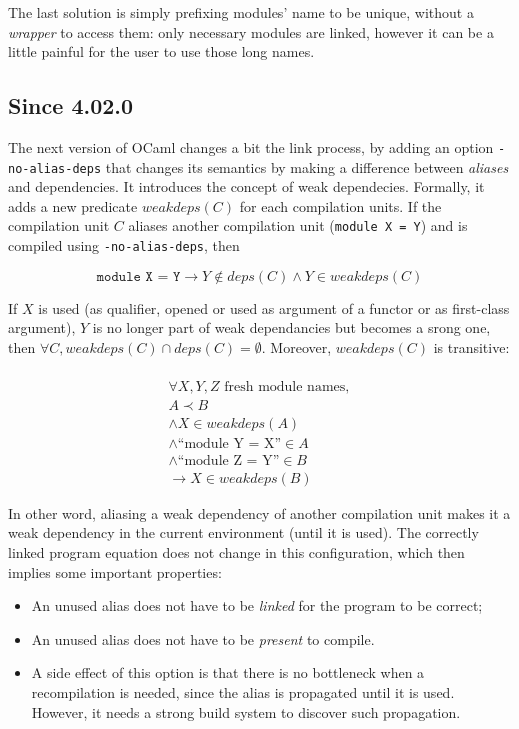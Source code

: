 \documentclass[11pt,a4paper]{article}
\begin{document}
The last solution is simply prefixing modules' name to be unique, without a
\emph{wrapper} to access them: only necessary modules are linked, however it can
be a little painful for the user to use those long names.

\subsection{Since 4.02.0}

The next version of OCaml changes a bit the link process, by adding an option
\texttt{-no-alias-deps} that changes its semantics by making a difference
between \emph{aliases} and dependencies. It introduces the concept of weak
dependecies. Formally, it adds a new predicate $weakdeps(C)$ for each
compilation units. If the compilation unit $C$ aliases another compilation unit
(\texttt{module X = Y}) and is compiled using \texttt{-no-alias-deps}, then

$$\texttt{module~X = Y} \rightarrow Y \notin deps(C) \land Y \in weakdeps(C)$$ 

If $X$ is used (as qualifier, opened or used as argument of a functor or as
first-class argument), $Y$ is no longer part of weak dependancies but becomes a
srong one, then $\forall C, weakdeps(C) \cap deps(C) = \emptyset$. Moreover,
$weakdeps(C)$ is transitive:

\begin{multline} \\
\forall X, Y, Z \text{ fresh module names}, \\ A \prec B \\
\land X \in weakdeps(A) \\ 
\land \text{``module Y = X''} \in A \\
\land \text{``module Z = Y''} \in B \\
\rightarrow X \in weakdeps(B)
\end{multline}

In other word, aliasing a weak dependency of another compilation unit makes it a
weak dependency in the current environment (until it is used). The correctly
linked program equation does not change in this configuration, which then
implies some important properties:
\begin{itemize}
\item An unused alias does not have to be \emph{linked} for the program to be correct;
\item An unused alias does not have to be \emph{present} to compile.
\item A side effect of this option is that there is no bottleneck when a
  recompilation is needed, since the alias is propagated until it is
  used. However, it needs a strong build system to discover such propagation.
\end{itemize}
\end{document}
